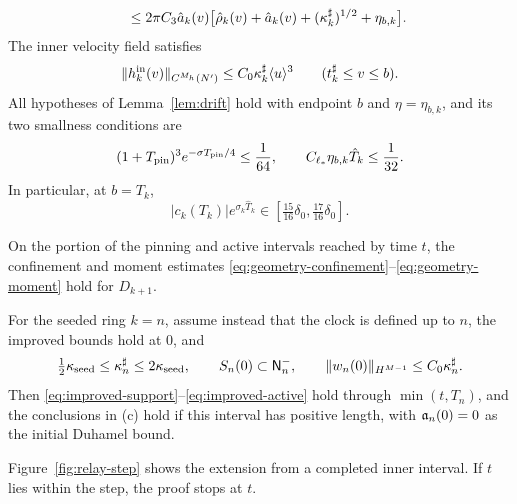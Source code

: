\begin{proposition}
\begin{enumerate}[label=\textup{(\alph*)}]
\begin{equation}
\begin{aligned}
&\qquad\le2\pi C_3\hat a_k(v)
\big[\hat\rho_k(v)+\hat a_k(v)+(\kappa^\sharp_k)^{1/2}+\eta_{b,k}\big].
\end{aligned}
\end{equation}
The inner velocity field satisfies
\begin{equation}
\label{eq:relay-inner-field}
\|h^{\mathrm{in}}_k(v)\|_{C^{M_h}(N')}\le C_0\kappa^\sharp_k\langle u\rangle^3
\qquad(t^\sharp_k\le v\le b).
\end{equation}
All hypotheses of Lemma~\ref{lem:drift} hold with endpoint $b$ and
$\eta=\eta_{b,k}$, and its two smallness conditions are
\begin{equation}
\label{eq:relay-drift-small}
(1+T_{\mathrm{pin}})^3e^{-\sigma T_{\mathrm{pin}}/4}\le\frac1{64},\qquad
C_{\ell_*}\eta_{b,k}\hat T_k\le\frac1{32}.
\end{equation}
In particular, at $b=T_k$,
\begin{equation}
\label{eq:relay-saturation}
|c_k(T_k)|e^{\sigma_k\hat T_k}
\in[\tfrac{15}{16}\delta_0,\tfrac{17}{16}\delta_0].
\end{equation}
\end{enumerate}
On the portion of the pinning and active intervals reached by time $t$,
the confinement and moment estimates
\eqref{eq:geometry-confinement}--\eqref{eq:geometry-moment} hold for $D_{k+1}$.

For the seeded ring $k=n$, assume instead that the clock is defined up to
$n$, the improved bounds hold at $0$, and
\begin{equation}
\label{eq:relay-seed}
\tfrac12\kappa_{\mathrm{seed}}\le\kappa^\sharp_n\le2\kappa_{\mathrm{seed}},\qquad
S_n(0)\subset\mathsf{N}^{-}_n,\qquad
\|w_n(0)\|_{H^{M-1}}\le C_0\kappa^\sharp_n.
\end{equation}
Then \eqref{eq:improved-support}--\eqref{eq:improved-active} hold through
$\min(t,T_n)$, and the conclusions in (c) hold if this interval has positive length, with
$\mathfrak{a}_n(0)=0$ as the initial Duhamel bound.
\end{proposition}

Figure~\ref{fig:relay-step} shows the extension from a completed inner
interval. If $t$ lies within the step, the proof stops at $t$.

